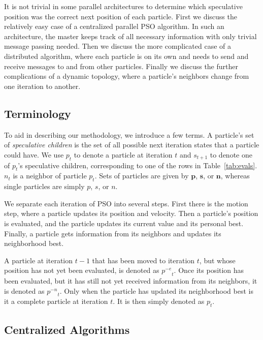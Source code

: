 \documentclass[journal,letterpaper]{IEEEtran}
\providecommand{\noeval}[1]{\ensuremath{#1^{-e}}}
\providecommand{\nonbest}[1]{\ensuremath{#1^{-n}}}
\providecommand{\p}{\ensuremath{p}}
\providecommand{\pset}{\ensuremath{\mathbf{p}}}
\providecommand{\s}{\ensuremath{s}}
\providecommand{\sset}{\ensuremath{\mathbf{s}}}
\providecommand{\n}{\ensuremath{n}}
\providecommand{\nset}{\ensuremath{\mathbf{n}}}
\begin{document}
It is not trivial in some parallel architectures to determine which speculative
position was the correct next position of each particle.  First we discuss the
relatively easy case of a centralized parallel PSO algorithm.  In such an
architecture, the master keeps track of all necessary information with only
trivial message passing needed.  Then we discuss the more complicated case of a
distributed algorithm, where each particle is on its own and needs to send and
receive messages to and from other particles.  Finally we discuss the further
complications of a dynamic topology, where a particle's neighbors change from
one iteration to another.

\subsection{Terminology}

To aid in describing our methodology, we introduce a few terms.  A particle's
set of \emph{speculative children} is the set of all possible next iteration
states that a particle could have.  We use $\p_t$ to denote a particle at
iteration $t$ and $\s_{t+1}$ to denote one of $\p_t$'s speculative children,
corresponding to one of the rows in Table~\ref{tab:evals}.  $\n_t$ is a
neighbor of particle $\p_t$.  Sets of particles are given by $\pset$, $\sset$,
or $\nset$, whereas single particles are simply $\p$, $\s$, or $\n$.

We separate each iteration of PSO into several steps.  First there is the
motion step, where a particle updates its position and velocity.  Then a
particle's position is evaluated, and the particle updates its current value
and its personal best.  Finally, a particle gets information from its neighbors
and updates its neighborhood best.

A particle at iteration $t-1$ that has been moved to iteration $t$, but whose
position has not yet been evaluated, is denoted as $\noeval{\p}_t$.  Once its
position has been evaluated, but it has still not yet received information from
its neighbors, it is denoted as $\nonbest{\p}_t$.  Only when the particle has
updated its neighborhood best is it a complete particle at iteration $t$.  It is
then simply denoted as $\p_t$.

\subsection{Centralized Algorithms}
\end{document}
